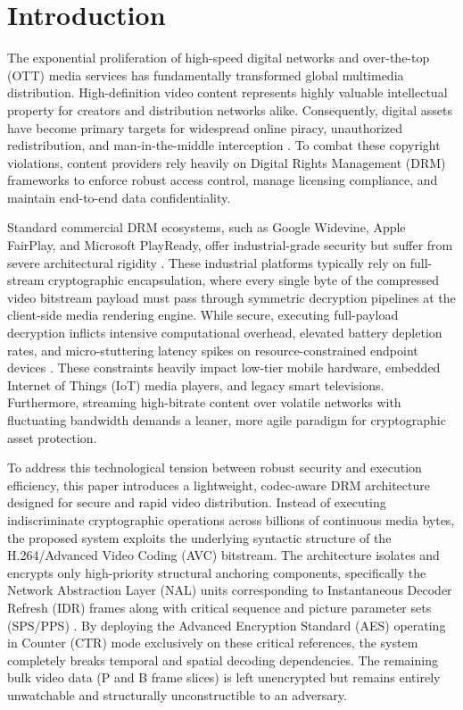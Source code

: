 \section{Introduction}

The exponential proliferation of high-speed digital networks and over-the-top (OTT) media services has fundamentally transformed global multimedia distribution. High-definition video content represents highly valuable intellectual property for creators and distribution networks alike. Consequently, digital assets have become primary targets for widespread online piracy, unauthorized redistribution, and man-in-the-middle interception \cite{bhattacharyya2021multimedia}. To combat these copyright violations, content providers rely heavily on Digital Rights Management (DRM) frameworks to enforce robust access control, manage licensing compliance, and maintain end-to-end data confidentiality.

Standard commercial DRM ecosystems, such as Google Widevine, Apple FairPlay, and Microsoft PlayReady, offer industrial-grade security but suffer from severe architectural rigidity \cite{nussbaumer2022drm}. These industrial platforms typically rely on full-stream cryptographic encapsulation, where every single byte of the compressed video bitstream payload must pass through symmetric decryption pipelines at the client-side media rendering engine. While secure, executing full-payload decryption inflicts intensive computational overhead, elevated battery depletion rates, and micro-stuttering latency spikes on resource-constrained endpoint devices \cite{subramanyam2023lightweight}. These constraints heavily impact low-tier mobile hardware, embedded Internet of Things (IoT) media players, and legacy smart televisions. Furthermore, streaming high-bitrate content over volatile networks with fluctuating bandwidth demands a leaner, more agile paradigm for cryptographic asset protection.

To address this technological tension between robust security and execution efficiency, this paper introduces a lightweight, codec-aware DRM architecture designed for secure and rapid video distribution. Instead of executing indiscriminate cryptographic operations across billions of continuous media bytes, the proposed system exploits the underlying syntactic structure of the H.264/Advanced Video Coding (AVC) bitstream. The architecture isolates and encrypts only high-priority structural anchoring components, specifically the Network Abstraction Layer (NAL) units corresponding to Instantaneous Decoder Refresh (IDR) frames along with critical sequence and picture parameter sets (SPS/PPS) \cite{winkler2024selective}. By deploying the Advanced Encryption Standard (AES) operating in Counter (CTR) mode exclusively on these critical references, the system completely breaks temporal and spatial decoding dependencies. The remaining bulk video data (P and B frame slices) is left unencrypted but remains entirely unwatchable and structurally unconstructible to an adversary.


